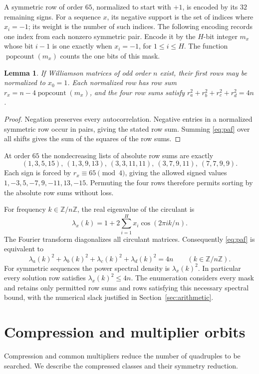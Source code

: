 \documentclass[11pt]{article}
\newtheorem{lemma}[theorem]{Lemma}
\newcommand{\Z}{\mathbb Z}
\begin{document}
A symmetric row of order $65$, normalized to start with $+1$, is
encoded by its $32$ remaining signs.
For a sequence $x$, its negative support is the set of indices where
$x_i=-1$; its weight is the number of such indices. The following encoding
records one index from each nonzero symmetric pair.
Encode it by the $H$-bit integer $m_x$ whose bit $i-1$ is one exactly
when $x_i=-1$, for $1\leq i\leq H$. The function
$\operatorname{popcount}(m_x)$ counts the one bits of this mask.
\begin{lemma}\label{lem:rowsum}
If Williamson matrices of odd order $n$ exist, their first rows may be
normalized to $x_0=1$. Each normalized row has row sum
$r_x=n-4\operatorname{popcount}(m_x)$, and the four row sums satisfy
$r_a^2+r_b^2+r_c^2+r_d^2=4n$.
\end{lemma}
\begin{proof}
Negation preserves every autocorrelation. Negative entries in a normalized
symmetric row occur in pairs, giving the stated row sum. Summing
\eqref{eq:paf} over all shifts gives the sum of the squares of the row sums.
\end{proof}
At order $65$ the nondecreasing lists of absolute row sums are exactly
\[
 (1,3,5,15),\ (1,3,9,13),\ (3,3,11,11),\ (3,7,9,11),\ (7,7,9,9).
\]
Each sign is forced by $r_x\equiv65\pmod4$, giving the allowed signed
values $1,-3,5,-7,9,-11,13,-15$. Permuting the four rows therefore permits
sorting by the absolute row sums without loss.

For frequency $k\in\Z/n\Z$, the real eigenvalue of the circulant is
\[
 \lambda_x(k)=1+2\sum_{i=1}^{H}x_i\cos(2\pi ik/n).
\]
The Fourier transform diagonalizes all circulant matrices. Consequently
\eqref{eq:paf} is equivalent to
\begin{equation}\label{eq:spectral}
 \lambda_a(k)^2+\lambda_b(k)^2+\lambda_c(k)^2+\lambda_d(k)^2=4n
 \qquad(k\in\Z/n\Z).
\end{equation}
For symmetric sequences the power spectral density is $\lambda_x(k)^2$.
In particular every solution row satisfies $\lambda_x(k)^2\leq4n$.
The enumeration considers every mask and retains only permitted row sums
and rows satisfying this necessary spectral bound, with the numerical
slack justified in Section~\ref{sec:arithmetic}.

\section{Compression and multiplier orbits}\label{sec:cover}
Compression and common multipliers reduce the number of quadruples to
be searched. We describe the compressed classes and their symmetry reduction.
\end{document}
